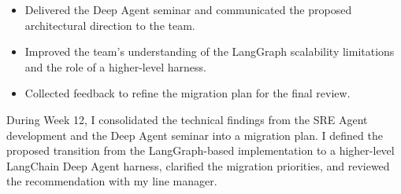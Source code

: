 
\begin{itemize}
    \item Delivered the Deep Agent seminar and communicated the proposed architectural direction to the team.
    \item Improved the team's understanding of the LangGraph scalability limitations and the role of a higher-level harness.
    \item Collected feedback to refine the migration plan for the final review.
\end{itemize}


During Week 12, I consolidated the technical findings from the SRE Agent development and the Deep Agent seminar into a migration plan. I defined the proposed transition from the LangGraph-based implementation to a higher-level LangChain Deep Agent harness, clarified the migration priorities, and reviewed the recommendation with my line manager.


